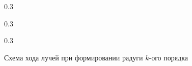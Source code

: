 \begin{figure}[t]
    \begin{subcaptionblock}{0.3\tw}
        \centering
        \label{pic:rainbow-1}
    \end{subcaptionblock}
    \hfill
    \begin{subcaptionblock}{0.3\tw}
        \centering
        \label{pic:rainbow-2}
    \end{subcaptionblock}
    \hfill
    \begin{subcaptionblock}{0.3\tw}   
        \centering
        \label{pic:rainbow-3}
    \end{subcaptionblock}
    \caption{Схема хода лучей при формировании радуги $k$-ого порядка}
    \label{pic:rainbow}
\end{figure}
